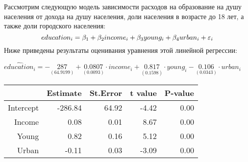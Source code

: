 \documentclass[pdftex,11pt,openany]{book}\usepackage[]{graphicx}\usepackage[]{color}
\begin{document}
\begin{problem}
 Рассмотрим следующую модель зависимости расходов на образование на душу населения от дохода на душу населения, доли населения в возрасте до 18 лет, а также доли городского населения: 
\[
education_i = \beta_1 + \beta_2 income_i + \beta_3 young_i + \beta_4 urban_i + \varepsilon_i
\]
Ниже приведены результаты оценивания уравнения этой линейной регрессии:
\begin{center}
\ensuremath{\widehat{education}_i=-\underset{(64.9199)}{287}+\underset{( 0.0093)}{0.0807}\cdot income_i+\underset{( 0.1598)}{0.817}\cdot young_i-\underset{( 0.0343)}{0.106}\cdot urban_i}%
\begin{table}[ht]
\centering
\begin{tabular}{rrrrr}
  \hline
 & Estimate & St.Error & t value & P-value \\ 
  \hline
Intercept & -286.84 & 64.92 & -4.42 & 0.00 \\ 
  Income & 0.08 & 0.01 & 8.67 & 0.00 \\ 
  Young & 0.82 & 0.16 & 5.12 & 0.00 \\ 
  Urban & -0.11 & 0.03 & -3.09 & 0.00 \\ 
   \hline
\end{tabular}
\end{table}


\end{center}


\end{problem}
\end{document}

